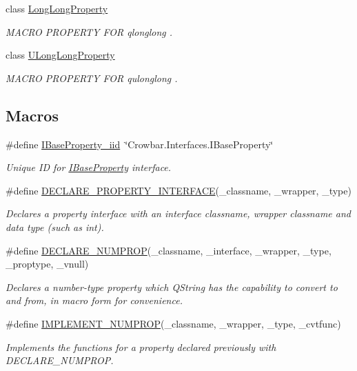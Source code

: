 \begin{DoxyCompactItemize}
class \hyperlink{class_long_long_property}{Long\-Long\-Property}
\begin{DoxyCompactList}\small\item\em M\-A\-C\-R\-O P\-R\-O\-P\-E\-R\-T\-Y F\-O\-R qlonglong . \end{DoxyCompactList}\item 
class \hyperlink{class_u_long_long_property}{U\-Long\-Long\-Property}
\begin{DoxyCompactList}\small\item\em M\-A\-C\-R\-O P\-R\-O\-P\-E\-R\-T\-Y F\-O\-R qulonglong . \end{DoxyCompactList}\end{DoxyCompactItemize}
\subsection*{Macros}
\begin{DoxyCompactItemize}
\item 
\hypertarget{group___property_classes_gade3d7799947a250392e929b65d46f1d8}{\#define \hyperlink{group___property_classes_gade3d7799947a250392e929b65d46f1d8}{I\-Base\-Property\-\_\-iid}~\char`\"{}Crowbar.\-Interfaces.\-I\-Base\-Property\char`\"{}}\label{group___property_classes_gade3d7799947a250392e929b65d46f1d8}

\begin{DoxyCompactList}\small\item\em Unique I\-D for \hyperlink{class_i_base_property}{I\-Base\-Property} interface. \end{DoxyCompactList}\item 
\#define \hyperlink{group___property_classes_gaac09fb32e07282e79330aeb7cfc9e5eb}{D\-E\-C\-L\-A\-R\-E\-\_\-\-P\-R\-O\-P\-E\-R\-T\-Y\-\_\-\-I\-N\-T\-E\-R\-F\-A\-C\-E}(\-\_\-classname, \-\_\-wrapper, \-\_\-type)
\begin{DoxyCompactList}\small\item\em Declares a property interface with an interface classname, wrapper classname and data type (such as int). \end{DoxyCompactList}\item 
\#define \hyperlink{group___property_classes_ga9b75216621cf38585610f12ce907d01c}{D\-E\-C\-L\-A\-R\-E\-\_\-\-N\-U\-M\-P\-R\-O\-P}(\-\_\-classname, \-\_\-interface, \-\_\-wrapper, \-\_\-type, \-\_\-proptype, \-\_\-vnull)
\begin{DoxyCompactList}\small\item\em Declares a number-\/type property which Q\-String has the capability to convert to and from, in macro form for convenience. \end{DoxyCompactList}\item 
\#define \hyperlink{group___property_classes_ga7a2a3856f997e7131ea7607b284b56b7}{I\-M\-P\-L\-E\-M\-E\-N\-T\-\_\-\-N\-U\-M\-P\-R\-O\-P}(\-\_\-classname, \-\_\-wrapper, \-\_\-type, \-\_\-cvtfunc)
\begin{DoxyCompactList}\small\item\em Implements the functions for a property declared previously with D\-E\-C\-L\-A\-R\-E\-\_\-\-N\-U\-M\-P\-R\-O\-P. \end{DoxyCompactList}\end{DoxyCompactItemize}
